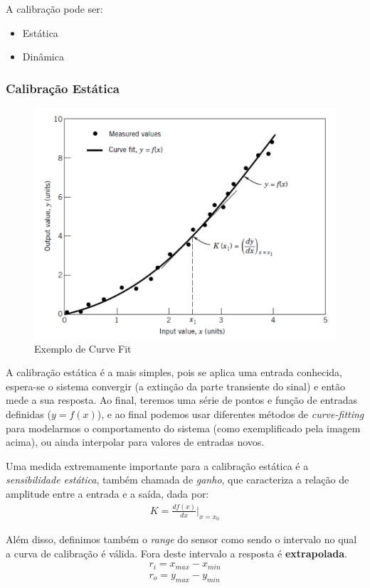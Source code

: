 \documentclass{article}
\begin{document}
            A calibração pode ser:
            \begin{itemize}
                \item Estática
                \item Dinâmica
            \end{itemize}

            \subsubsection{Calibração Estática}
                \begin{figure}[h]
                    \centering
                    \includegraphics[width=.5\textwidth]{imgs/curve_fitting_est.png}
                    \caption{Exemplo de Curve Fit}
                \end{figure}

                A calibração estática é a mais simples, pois se aplica uma entrada conhecida, espera-se o sistema convergir (a extinção da parte transiente do sinal) e então mede a sua resposta.
                Ao final, teremos uma série de pontos e função de entradas definidas ($y = f(x)$), e ao final podemos usar diferentes métodos de \emph{curve-fitting} para modelarmos o comportamento do
                sistema (como exemplificado pela imagem acima), ou ainda interpolar para valores de entradas novos.

                Uma medida extremamente importante para a calibração estática é a \emph{sensibilidade estática}, também chamada de \emph{ganho}, que caracteriza a relação de amplitude entre a entrada
                e a saída, dada por:
                \begin{align}
                    K = \frac{df(x)}{dx} \bigg\rvert_{x=x_0} \label{eq:ganho_calib_estatica}
                \end{align}

                Além disso, definimos também o \emph{range} do sensor como sendo o intervalo no qual a curva de calibração é válida. Fora deste intervalo a resposta é \textbf{extrapolada}.
                \begin{align}
                    r_i = x_{max}-x_{min} \\
                    r_o = y_{max}-y_{min}
                \end{align}
\end{document}

